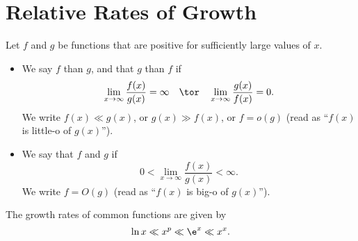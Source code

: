 \section{Relative Rates of Growth}

\begin{definition}
    Let $f$ and $g$ be functions that are positive for sufficiently large values of $x$. 
    \begin{itemize}
        \item We say $f$  than $g$, and that $g$  than $f$ if \[\lim_{x \to \infty} \frac{f(x)}{g(x)} = \infty \quad \tor \quad \lim_{x \to \infty} \frac{g(x)}{f(x)} = 0.\] We write $f(x) \ll g(x)$, or $g(x) \gg f(x)$, or $f = o(g)$ (read as ``$f(x)$ is little-o of $g(x)$'').
        \item We say that $f$ and $g$  if \[0 < \lim_{x \to \infty} \frac{f(x)}{g(x)} < \infty.\] We write $f = O(g)$ (read as ``$f(x)$ is big-o of $g(x)$'').
    \end{itemize}
\end{definition}

\begin{example}
    The growth rates of common functions are given by \[\ln x \ll x^p \ll \e^x \ll x^x.\]
\end{example}